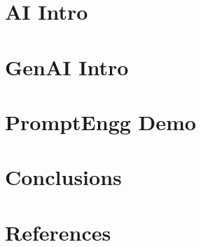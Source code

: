 \section[AI]{AI Intro}


\section[GenAI]{GenAI Intro}


\section[Demo]{PromptEngg Demo}


\section[Concl]{Conclusions}



\section[Refs]{References}
